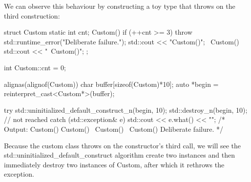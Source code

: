 We can observe this behaviour by constructing a toy type that throws on the third construction:

\begin{box-note}
\begin{cppcode}
struct Custom {
  static int cnt;
  Custom() { 
    if (++cnt >= 3)
      throw std::runtime_error("Deliberate failure."); 
    std::cout << "Custom()\n";
  }
  ~Custom() {
    std::cout << "~Custom()\n";
  }
};

int Custom::cnt = 0;

alignas(alignof(Custom)) char buffer[sizeof(Custom)*10];
auto *begin = reinterpret_cast<Custom*>(buffer);

try {
  std::uninitialized_default_construct_n(begin, 10);
  std::destroy_n(begin, 10); // not reached
} catch (std::exception& e) {
  std::cout << e.what() << "\n";
}
/* Output:
Custom()
Custom()
~Custom()
~Custom()
Deliberate failure.
*/
\end{cppcode}
\end{box-note}

Because the custom class throws on the constructor’s third call, we will see the std::uninitialized\_default\_construct algorithm create two instances and then immediately destroy two instances of Custom, after which it rethrows the exception.
